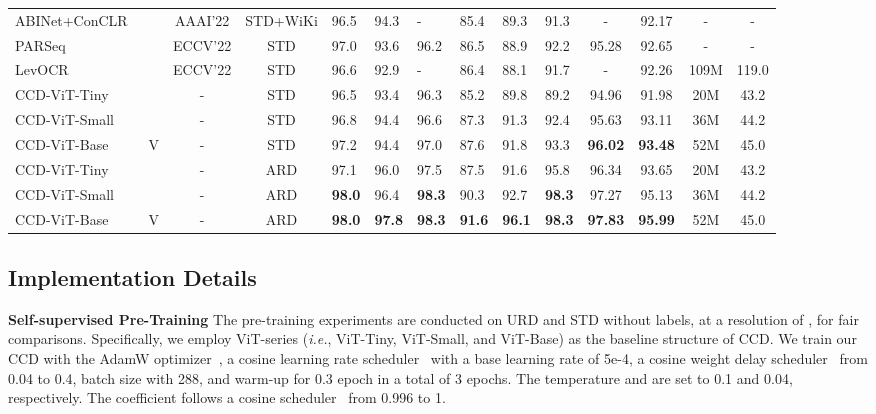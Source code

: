 \documentclass[10pt,twocolumn,letterpaper]{article}
\begin{document}
\begin{table*}[t]
{\begin{tabular}{l|c|c|c|p{7mm}<{\centering}p{7mm}<{\centering}p{7mm}<{\centering}p{7mm}<{\centering}p{7mm}<{\centering}p{7mm}<{\centering}|c|c|c|c}
  ABINet+ConCLR~\cite{ConCLR}  & &AAAI'22&STD+WiKi &96.5 &94.3 &- &85.4 &89.3 &91.3 &-&92.17&- &-\\
  PARSeq~\cite{bautista2022parseq} & &ECCV'22&STD &97.0 &93.6 &96.2 &86.5 &88.9 &92.2 &95.28&92.65&- &-\\
  LevOCR~\cite{LevOCR}  & &ECCV'22&STD &96.6 &92.9 &- &86.4 &88.1 &91.7 &-&92.26&109M &119.0\\
  \hline
  \rowcolor{mygray}
  CCD-ViT-Tiny           & &- &STD &96.5  &93.4 &96.3 &85.2 &89.8 &89.2 &94.96&91.98&20M &43.2 \\
  \rowcolor{mygray}
  CCD-ViT-Small           & &- &STD &96.8  &94.4 &96.6 &87.3 &91.3 &92.4 &95.63&93.11&36M &44.2 \\
  \rowcolor{mygray}
  CCD-ViT-Base           &\multirow{-3}{*}{V} &- &STD &97.2  &94.4 &97.0 &87.6 &91.8 &93.3 &\textbf{96.02}&\textbf{93.48}&52M  &45.0\\
  \hline
  \rowcolor{mygray}
  CCD-ViT-Tiny           & &- &ARD &97.1  &96.0 &97.5 &87.5 &91.6 &95.8 &96.34&93.65&20M  &43.2\\ 
  \rowcolor{mygray}
  CCD-ViT-Small           & &- &ARD &\textbf{98.0} &96.4 &\textbf{98.3} &90.3 &92.7 &\textbf{98.3}  &97.27&95.13&36M  &44.2\\
  \rowcolor{mygray}
  CCD-ViT-Base           &\multirow{-3}{*}{V} &- &ARD &\textbf{98.0} &\textbf{97.8} &\textbf{98.3} &\textbf{91.6}  &\textbf{96.1} &\textbf{98.3} &\textbf{97.83}&\textbf{95.99}&52M  &45.0\\
  \bottomrule
\end{tabular}     }
\label{tb:results}
\vspace{-1.2em}
\end{table*}

\vspace{-1.2em}
\subsection{Implementation Details}
\noindent \textbf{Self-supervised Pre-Training}
 The pre-training experiments are conducted on URD and STD without labels, at a resolution of , for fair comparisons. 
 Specifically, we employ ViT-series (\emph{i.e.},  ViT-Tiny,  ViT-Small, and ViT-Base) as the baseline structure of CCD. We train our CCD with the AdamW optimizer~\cite{AdamW}, a cosine learning rate scheduler~\cite{Cosine} with a base learning rate of 5e-4, a cosine weight delay scheduler~\cite{Cosine} from 0.04 to 0.4, batch size with 288, and warm-up for 0.3 epoch in a total of 3 epochs. The temperature  and  are set to 0.1 and 0.04, respectively. The coefficient  follows a cosine scheduler~\cite{Cosine} from 0.996 to 1.
\end{document}
